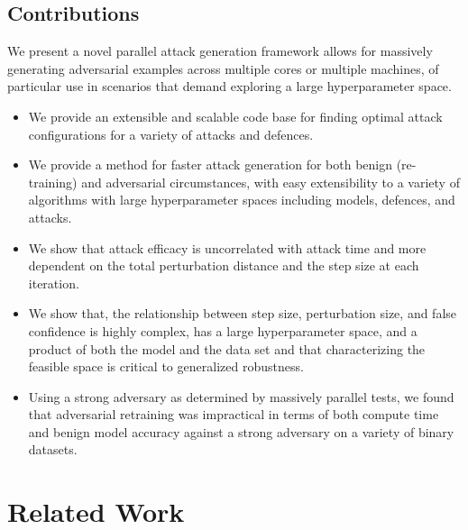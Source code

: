 \documentclass[runningheads]{llncs}
\begin{document}
\subsection{Contributions}


We present a novel parallel attack generation framework allows for massively generating adversarial examples across multiple cores or multiple machines, of particular use in scenarios that demand exploring a large hyperparameter space.

\begin{itemize}

    \item We provide an extensible and scalable code base for finding optimal attack configurations for a variety of attacks and defences.

    \item  We provide a method for faster attack generation for both benign (re-training) and adversarial circumstances, with easy extensibility to a variety of algorithms with large hyperparameter spaces including  models, defences, and attacks.
    
    \item We show that attack efficacy is uncorrelated with attack time and more dependent on the total perturbation distance and the step size at each iteration.

    \item We show that, the relationship between step size, perturbation size, and false confidence is highly complex, has a large hyperparameter space, and a product of both the model and the data set and that characterizing the feasible space is critical to generalized robustness.

    \item Using a strong adversary as determined by massively parallel tests, we found that adversarial retraining was impractical in terms of both compute time and benign model accuracy against a strong adversary on a variety of binary datasets.
    
\end{itemize}

\section{Related Work}
\end{document}
